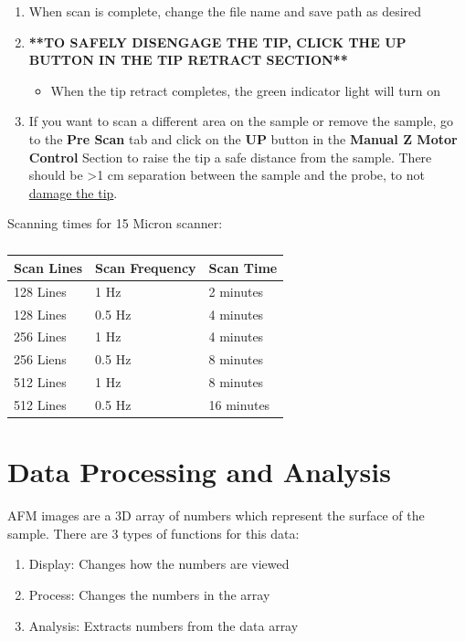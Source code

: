 \documentclass{../lab}
\begin{document}
\begin{enumerate}
    \item When scan is complete, change the file name and save path as desired
    
    \item\textbf{**TO SAFELY DISENGAGE THE TIP, CLICK THE UP BUTTON IN THE TIP RETRACT SECTION**}
    \begin{itemize}
        \item When the tip retract completes, the green indicator light will turn on
    \end{itemize}
    
    \item If you want to scan a different area on the sample or remove the sample, go to the \textbf{Pre Scan }tab and click on the \textbf{UP }button in the \textbf{Manual Z Motor Control }Section to raise the tip a safe distance from the sample.  There should be >1 cm separation between the sample and the probe, to not \hyperref[subsec:BrokenTip]{damage the tip}.
\end{enumerate}

Scanning times for 15 Micron scanner:

\begin{table}[H]
    \centering
    \begin{tabular}{l|l|l}
        Scan Lines & Scan Frequency & Scan Time \\\hline
        128 Lines  & 1 Hz           & 2 minutes \\\hline
        128 Lines  & 0.5 Hz         & 4 minutes \\\hline
        256 Lines  & 1 Hz           & 4 minutes \\\hline
        256 Liens  & 0.5 Hz         & 8 minutes \\\hline
        512 Lines  & 1 Hz           & 8 minutes \\\hline
        512 Lines  & 0.5 Hz         & 16 minutes
    \end{tabular}
    \caption{}
\end{table}

\section{Data Processing and Analysis}
\label{sec:DataProcessingAndAnalysis}

AFM images are a 3D array of numbers which represent the surface of the sample.  There are 3 types of functions for this data:
\begin{enumerate}
    \item Display: Changes how the numbers are viewed
    
    \item Process: Changes the numbers in the array
    
    \item Analysis: Extracts numbers from the data array
\end{enumerate}
\end{document}
